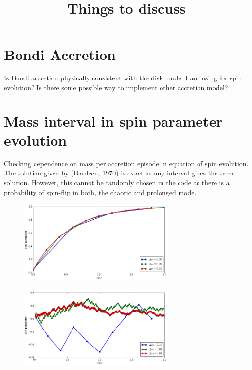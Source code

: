 \documentclass[a4,useAMS,usenatbib,usegraphicx,12pt]{article}
\title{Things to discuss}
\author{}
\date{}
\begin{document}
\maketitle

\section{Bondi Accretion}
Is Bondi accretion physically consistent with the disk model I am using for spin evolution?
Is there some possible way to implement other accretion model?


\section{Mass interval in spin parameter evolution}
Checking dependence on mass per accretion episode in equation of spin evolution. The solution
given by (Bardeen, 1970) is exact as any interval gives the same solution. However, this cannot
be randomly chosen in the code as there is a probability of spin-flip in both, the chaotic and
prolonged mode.

\begin{figure}[htbp]
\centering
\includegraphics[width=0.7\textwidth]{./figures/SpinEvolution.png}
\end{figure}

\begin{figure}[htbp]
\centering
\includegraphics[width=0.7\textwidth]{./figures/SpinEvolutionFlip.png}
\end{figure}
\end{document}
